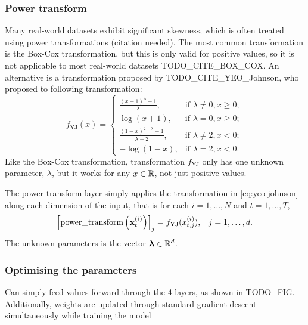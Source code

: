 \documentclass{statsmsc}
\begin{document}
\subsubsection{Power transform}%
\label{ssub:Power transform}

Many real-world datasets exhibit significant skewness, which is often treated using power
transformations (citation needed). The most common transformation is the Box-Cox transformation,
but this is only valid for positive values, so it is not applicable to most real-world datasets
TODO\_CITE\_BOX\_COX. An alternative is a transformation proposed by TODO\_CITE\_YEO\_Johnson,
who proposed to following transformation:
\begin{equation}\label{eq:yeo-johnson}
    f_{\textrm{YJ}}(x)= \left\{
        \begin{array}{ll}
            \frac{(x+1)^\lambda-1}{\lambda}, & \textrm{if } \lambda \neq 0, x \geq 0; \\
            \log(x + 1), & \textrm{if } \lambda = 0, x \geq 0;  \\
            \frac{(1-x)^{2-\lambda}-1}{\lambda-2} , & \textrm{if } \lambda \neq 2, x < 0; \\
            -\log(1-x), & \textrm{if } \lambda=2, x < 0.
        \end{array}
    \right.
\end{equation}
Like the Box-Cox transformation, transformation $f_{\textrm{YJ}}$ only has one unknown parameter, $\lambda$, but
it works for any $x \in \mathbb{R}$, not just positive values.

The power transform layer simply applies the transformation in \cref{eq:yeo-johnson} along each dimension of the input, that is for each $i=1,\dots,N$ and $t=1,\dots,T$,
\begin{equation}
\left[\textrm{power\_transform}\left(\mathbf{x}_t^{(i)}\right)\right]_j=f_{\textrm{YJ}}(x_{t,j}^{(i)}), \;\;\; j=1,\dots,d.
\end{equation}
The unknown parameters is the vector $\bm\lambda \in \mathbb{R}^d$.



\subsubsection{Optimising the parameters}%
\label{ssub:Optimising the parameters}

Can simply feed values forward through the 4 layers, as shown in TODO\_FIG.
Additionally, weights are updated through standard gradient descent simultaneously while
training the model
\end{document}
